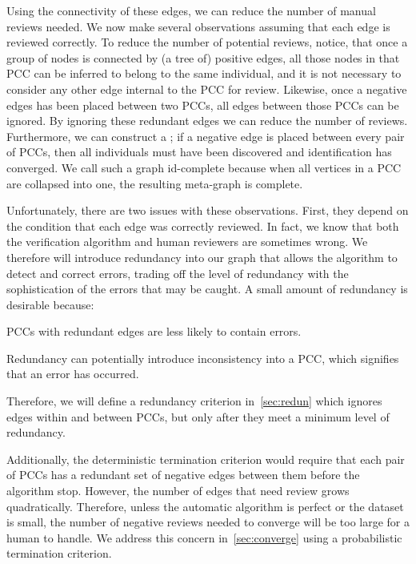 Using the connectivity of these edges, we can reduce the number of manual reviews needed.
We now make several observations assuming that each edge is reviewed correctly.
To reduce the number of potential reviews, notice, that once a group of nodes is connected by (a tree of)
  positive edges, all those nodes in that PCC can be inferred to belong to the same individual, and it is not
  necessary to consider any other edge internal to the PCC for review.
Likewise, once a negative edges has been placed between two PCCs, all edges between those PCCs can be ignored.
By ignoring these redundant edges we can reduce the number of reviews.
Furthermore, we can construct a ; if a negative edge is placed
  between every pair of PCCs, then all individuals must have been discovered and identification has converged.
We call such a graph id-complete because when all vertices in a PCC are collapsed into one, the resulting
  meta-graph is complete.

Unfortunately, there are two issues with these observations.
First, they depend on the condition that each edge was correctly reviewed.
In fact, we know that both the verification algorithm and human reviewers are sometimes wrong.
We therefore will introduce redundancy into our graph that allows the algorithm to detect and correct errors,
  trading off the level of redundancy with the sophistication of the errors that may be caught.
A small amount of redundancy is desirable because:
\begin{itemln}
    \item PCCs with redundant edges are less likely to contain errors.
    \item Redundancy can potentially introduce inconsistency into a PCC, which signifies that an error has
      occurred.
\end{itemln}
Therefore, we will define a redundancy criterion in~\cref{sec:redun} which ignores edges within and between PCCs,
  but only after they meet a minimum level of redundancy.

Additionally, the deterministic termination criterion would require that each pair of PCCs has a redundant set of
  negative edges between them before the algorithm stop.
However, the number of edges that need review grows quadratically.
Therefore, unless the automatic algorithm is perfect or the dataset is small, the number of negative reviews
  needed to converge will be too large for a human to handle.
We address this concern in~\cref{sec:converge} using a probabilistic termination criterion.

